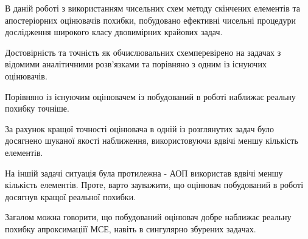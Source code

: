 

В даній роботі з використанням чисельних схем методу скінчених елементів та апостеріорних оцінювачів похибки, побудовано ефективні чисельні процедури дослідження широкого класу двовимірних крайових задач.

Достовірність та точність як обчислювальних схемперевірено на задачах з відомими аналітичними розв’язками та порівняно з одним із існуючих оцінювачів.

Порівняно із існуючим оцінювачем із \cite{OstShynAee11} побудований в роботі наближає реальну похибку точніше.

За рахунок кращої точності оцінювача в одній із розглянутих задач було досягнено шуканої якості наближення, використовуючи вдвічі меншу кількість елементів.

На іншій задачі ситуація була протилежна - АОП \cite{OstShynAee11} використав вдвічі меншу кількість елементів. Проте, варто зауважити, що оцінювач побудований в роботі досягнув кращої реальної похибки.

Загалом можна говорити, що побудований оцінювач добре наближає реальну похибку апроксимаціїї МСЕ, навіть в сингулярно збурених задачах.

